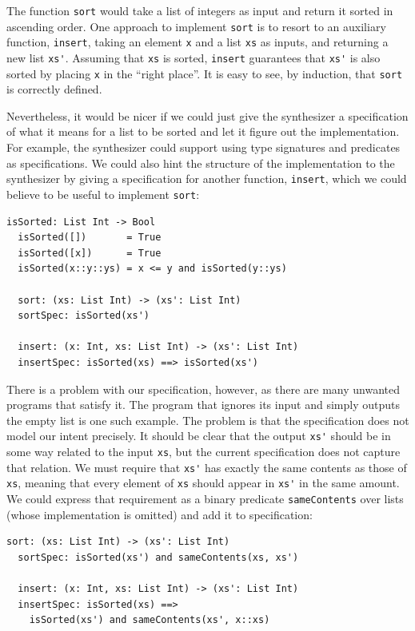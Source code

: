 \noindent
The function \lstinline{sort} would take a list of integers as input and return
it sorted in ascending order. One approach to implement \lstinline{sort} is to
resort to an auxiliary function, \lstinline{insert}, taking an element
\lstinline{x} and a list \lstinline{xs} as inputs, and returning a new list
\lstinline{xs'}. Assuming that \lstinline{xs} is sorted, \lstinline{insert}
guarantees that \lstinline{xs'} is also sorted by placing \lstinline{x} in the
``right place''. It is easy to see, by induction, that \lstinline{sort} is
correctly defined.

Nevertheless, it would be nicer if we could just give the synthesizer a
specification of what it means for a list to be sorted and let it figure out the
implementation. For example, the synthesizer could support using type signatures
and predicates as specifications. We could also hint the structure of the
implementation to the synthesizer by giving a specification for another
function, \lstinline{insert}, which we could believe to be useful to implement
\lstinline{sort}:

\begin{lstlisting}[xleftmargin=.2\textwidth]
  isSorted: List Int -> Bool
  isSorted([])       = True
  isSorted([x])      = True
  isSorted(x::y::ys) = x <= y and isSorted(y::ys)

  sort: (xs: List Int) -> (xs': List Int)
  sortSpec: isSorted(xs')

  insert: (x: Int, xs: List Int) -> (xs': List Int)
  insertSpec: isSorted(xs) ==> isSorted(xs')
\end{lstlisting}

\noindent
There is a problem with our specification, however, as there are many unwanted
programs that satisfy it.
The program that ignores its input and simply outputs the empty list is one such
example.
The problem is that the specification does not model our intent precisely.
It should be clear that the output \lstinline{xs'} should be in some way related
to the input \lstinline{xs}, but the current specification does not capture that
relation.
We must require that \lstinline{xs'} has exactly the same contents as those of
\lstinline{xs}, meaning that every element of \lstinline{xs} should appear in
\lstinline{xs'} in the same amount.
We could express that requirement as a binary predicate \lstinline{sameContents}
over lists (whose implementation is omitted) and add it to specification:

\begin{lstlisting}[xleftmargin=.2\textwidth]
  sort: (xs: List Int) -> (xs': List Int)
  sortSpec: isSorted(xs') and sameContents(xs, xs')

  insert: (x: Int, xs: List Int) -> (xs': List Int)
  insertSpec: isSorted(xs) ==>
    isSorted(xs') and sameContents(xs', x::xs)
\end{lstlisting}


